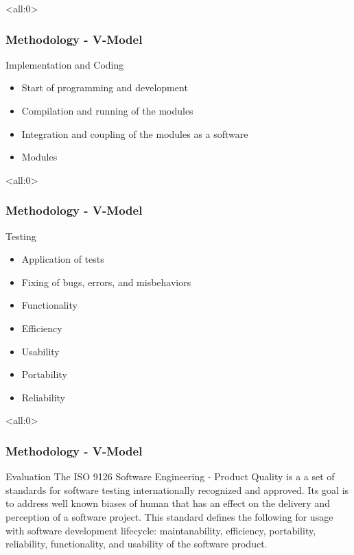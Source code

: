 \documentclass[handout]{beamer}
\begin{document}
\begin{frame}<all:0>
	\frametitle{Methodology - V-Model}
	\begin{block}{Implementation and Coding}
		\begin{itemize}
			\item<1-> Start of programming and development
			\item<2-> Compilation and running of the modules
			\item<3-> Integration and coupling of the modules as a software
		\end{itemize}

		\begin{itemize}
			\item<4-> Modules
		\end{itemize}
	\end{block}
\end{frame}

\begin{frame}<all:0>
	\frametitle{Methodology - V-Model}
	\begin{block}{Testing}
		\begin{itemize}
			\item<1-> Application of tests
			\item<2-> Fixing of bugs, errors, and misbehaviors
		\end{itemize}

		\begin{itemize}
			\item<3-> Functionality
			\item<4-> Efficiency
			\item<5-> Usability
			\item<6-> Portability
			\item<7-> Reliability
		\end{itemize}
	\end{block}
\end{frame}

\begin{frame}<all:0>
	\frametitle{Methodology - V-Model}
	\begin{block}{Evaluation}
		The ISO 9126 Software Engineering - Product Quality is a a set of standards for
		software testing internationally recognized and approved. Its goal is to
		address well known biases of human that has an effect on the delivery and
		perception of a software project. This standard defines the following for usage
		with software development lifecycle: maintanability, efficiency, portability,
		reliability, functionality, and usability of the software product.
	\end{block}
\end{frame}
\end{document}
